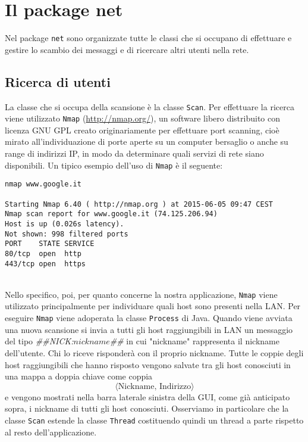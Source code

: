 \section{Il package net}
Nel package \texttt{net} sono organizzate tutte le classi che si occupano di effettuare e gestire lo
scambio dei messaggi e di ricercare altri utenti nella rete.

\subsection{Ricerca di utenti}
La classe che si occupa della scansione è la classe \texttt{Scan}. Per effettuare la
ricerca viene utilizzato \texttt{Nmap} (\url{http://nmap.org/}),  un software libero distribuito
con licenza GNU GPL creato originariamente per effettuare port scanning, cioè mirato
all'individuazione di porte aperte su un computer bersaglio o anche su range di indirizzi IP,
in modo da determinare quali servizi di rete siano disponibili. Un tipico esempio dell'uso
di \texttt{Nmap} è il seguente:

\begin{lstlisting}
nmap www.google.it

Starting Nmap 6.40 ( http://nmap.org ) at 2015-06-05 09:47 CEST
Nmap scan report for www.google.it (74.125.206.94)
Host is up (0.026s latency).
Not shown: 998 filtered ports
PORT    STATE SERVICE
80/tcp  open  http
443/tcp open  https
\end{lstlisting}
\leavevmode
\\
Nello specifico, poi, per quanto concerne la nostra applicazione, \texttt{Nmap}
viene utilizzato principalmente per individuare quali host sono presenti nella LAN.
Per eseguire \texttt{Nmap} viene adoperata la classe \texttt{Process} di Java.
Quando viene avviata una nuova scansione si invia a tutti gli host raggiungibili in LAN
un messaggio del tipo \emph{\#\#NICK:$nickname$\#\#} in cui "nickname" rappresenta il nickname
dell'utente. Chi lo riceve risponderà con il proprio nickname. Tutte le coppie degli 
host raggiungibili che hanno risposto vengono salvate tra gli host conosciuti in una mappa
a doppia chiave come coppia 
$$ \langle \text{Nickname, Indirizzo} \rangle $$
e vengono mostrati nella barra laterale sinistra della GUI, come già anticipato sopra, i
nickname di tutti gli host conosciuti. Osserviamo in particolare che la classe \texttt{Scan}
estende la classe \texttt{Thread} costituendo quindi un thread a parte rispetto al resto
dell'applicazione.

